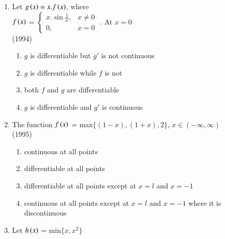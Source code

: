 \documentclass[journal,12pt,twocolumn]{IEEEtran}
\theoremstyle{remark}
\begin{document}
\begin{enumerate}
    \item
\begin{flushleft}


   
    {Let $g\left(x\right)=x.f\left(x\right)$, where\\[6pt] $f\left(x\right)$ = $\begin{cases}
        x.\sin\frac{1}{x}, & x\neq 0\\
        0, & x=0
    \end{cases}$
    . At $x=0$} \\
   
    \hfill
    {(1994)}
   
    \begin{enumerate}[label=(\alph*)]
       
        \item $g$ is differentiable but $g'$ is not continuous
        \item $g$ is differentiable while $f$ is not
        \item both $f$ and $g$ are differentiable
        \item $g$ is differentiable and $g'$ is continuous
    \end{enumerate}
\end{flushleft}

    \item
\begin{flushleft}
   
     {The function $f\left(x\right)$ = max$\{(1-x),(1+x),2\}$, $x\in (-\infty,\infty)$} \\

    \hfill
    {(1995)}
   
    \begin{enumerate}[label=(\alph*)]
       
        \item continuous at all points
        \item differentiable at all points
        \item differentiable at all points except at $x=l$ and $x=-1$
        \item continuous at all points except at $x=l$ and $x=-1$ where it is discontinuous
    \end{enumerate}
\end{flushleft}

    \item
\begin{flushleft}
    Let $h\left(x\right)$ = min$\{x,x^{2}\}$ \\


\end{flushleft}
\end{enumerate}
\end{document}
